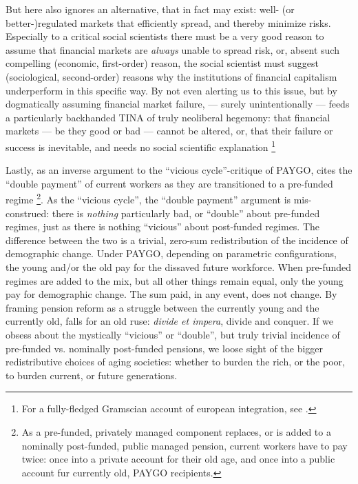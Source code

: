 \documentclass[11pt,a4paper,oneside,openright]{article}
\begin{document}
\begin{enumerate}
	But \citeauthor{Cerami2009a} here also ignores an alternative, that in fact may exist: 
	well- (or better-)regulated markets that efficiently spread, and thereby minimize risks. 
	Especially to a critical social scientists there must be a very good reason to assume that financial markets are \emph{always} unable to spread risk, or, absent such compelling (economic, first-order) reason, the social scientist must suggest (sociological, second-order) reasons why the institutions of financial capitalism underperform in this specific way. 
	By not even alerting us to this issue, but by dogmatically assuming financial market failure, \citeauthor{Cerami2009a} --- surely unintentionally --- feeds a particularly backhanded TINA of truly neoliberal hegemony: 
	that financial markets --- be they good or bad --- cannot be altered, or, that their failure or success is inevitable, and needs no social scientific explanation
	\footnote{
		For a fully-fledged Gramscian account of european integration, see \cite{Bieler2002,Bieler2003,Bieler2005}.
	}
	
	Lastly, as an inverse argument to the ``vicious cycle''-critique of PAYGO, \citeauthor{Cerami2009a} cites the ``double payment'' of current workers as they are transitioned to a pre-funded regime
	\footnote{
		As a pre-funded, privately managed component replaces, or is added to a nominally post-funded, public managed pension, current workers have to pay twice: 
		once into a private account for their old age, and once into a public account fur currently old, PAYGO recipients.
	}. 
	As the ``vicious cycle'', the ``double payment'' argument is mis-construed: 
	there is \emph{nothing} particularly bad, or ``double'' about pre-funded regimes, just as there is nothing ``vicious'' about post-funded regimes. 
	The difference between the two is a trivial, zero-sum redistribution of the incidence of demographic change. 
	Under PAYGO, depending on parametric configurations, the young and/or the old pay for the dissaved future workforce. 
	When pre-funded regimes are added to the mix, but all other things remain equal, only the young pay for demographic change. 
	The sum paid, in any event, does not change. 
	By framing pension reform as a struggle between the currently young and the currently old, \citeauthor{Cerami2009a} falls for an old ruse: 
	\emph{divide et impera}, divide and conquer. 
	If we obsess about the mystically ``vicious'' or ``double'', but truly trivial incidence of pre-funded vs. nominally post-funded pensions, we loose sight of the bigger redistributive choices of aging societies: 
	whether to burden the rich, or the poor, to burden current, or future generations.
\end{enumerate}
\end{document}
